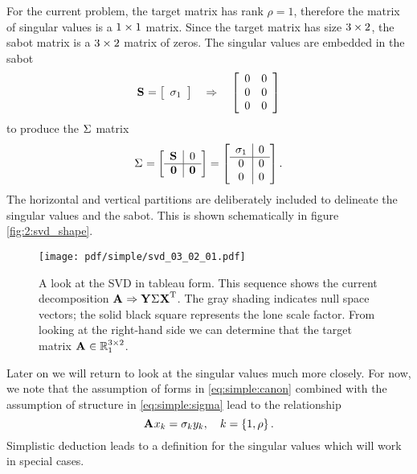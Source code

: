 For the current problem, the target matrix has rank $\rho=1$, therefore the matrix of singular values is a $\bys{1}$ matrix. Since the target matrix has size $\by{3}{2}$, the sabot matrix is a $\by{3}{2}$ matrix of zeros. The singular values are embedded in the sabot
\begin{equation}
  \ess{}=\mat{c}{\sigma_{1}} \quad \Rightarrow \quad \mat{cc}{0&0\\0&0\\0&0}
\end{equation}
to produce the $\sig{}$ matrix
\begin{equation}
  \sig{}=\mat{c|c}{\ess{}&0\\\hline\zero&\zero} = \mat{c|c}{\sigma_{1}&0\\\hline0&0\\0&0}.
  \label{eq:simple:sigma}
\end{equation}
The horizontal and vertical partitions are deliberately included to delineate the singular values and the sabot. This is shown schematically in figure \eqref{fig:2:svd_shape}.

\begin{figure}[h] %
   \centering
   \texttt{[image: pdf/simple/svd\_03\_02\_01.pdf]} 
   \caption{A look at the SVD in tableau form. This sequence shows the current decomposition $\A{}\Rightarrow\Y{}\sig{}\X{T}$. The gray shading indicates null space vectors; the solid black square represents the lone scale factor. From looking at the right-hand side we can determine that the target matrix $\A{}\in\real{\by{3}{2}}_{1}$.}
   \label{fig:2:svd_shape}
\end{figure}

Later on we will return to look at the singular values much more closely. For now, we note that the assumption of forms in \eqref{eq:simple:canon} combined with the assumption of structure in \eqref{eq:simple:sigma} lead to the relationship
\begin{equation}
  \A{}x_{k} = \sigma_{k} y_{k}, \quad k=\lst{1,\rho}.
\end{equation}
Simplistic deduction leads to a definition for the singular values which will work in special cases.

